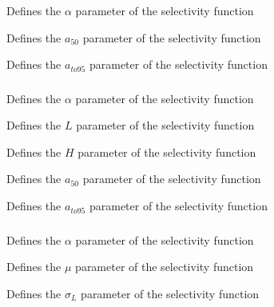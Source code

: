 {Defines the $\alpha$ parameter of the selectivity function}

 {Defines the $a_{50}$ parameter of the selectivity function}

 {Defines the $a_{to95}$ parameter of the selectivity function}

\subsubsection[Logistic producing]{}

 {Defines the $\alpha$ parameter of the selectivity function}

 {Defines the $L$ parameter of the selectivity function}

 {Defines the $H$ parameter of the selectivity function}

 {Defines the $a_{50}$ parameter of the selectivity function}

 {Defines the $a_{to95}$ parameter of the selectivity function}

\subsubsection[Double-normal]{}

 {Defines the $\alpha$ parameter of the selectivity function}

 {Defines the $\mu$ parameter of the selectivity function}

 {Defines the $\sigma_L$ parameter of the selectivity function}

